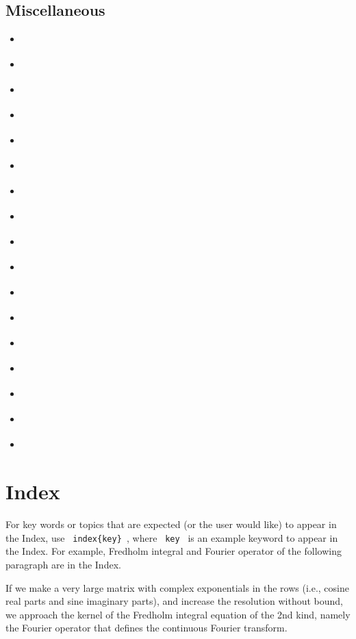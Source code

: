 \begin{multicols}{2}
\subsection*{Miscellaneous}
\begin{itemize}
     \item \cite{almendro}
     \item \cite{baez/online}
     \item \cite{chiu}
     \item \cite{geer}
     \item \cite{hunt-76}
     \item \cite{itzhaki}
     \item \cite{kowalik}
     \item \cite{laufenberg}
     \item \cite{loh}
     \item \cite{markey}
     \item \cite{misc-full}
     \item \cite{padhye}
     \item \cite{sorace}
     \item \cite{wassenberg}
     \item \cite{matuz:doody}
     \item \cite{misc-minimal}
     \item \cite{jcg}
\end{itemize}


\end{multicols}

\cleardoublepage









\newpage
\section*{Index}

For key words or topics that are expected (or the user would like) to appear in the Index, use \verb| index{key} |, where  \verb| key | is an example keyword to appear in the Index. For example, Fredholm integral and Fourier operator of the following paragraph are in the Index. 

If we make a very large matrix with complex exponentials in the rows (i.e., cosine real parts and sine imaginary parts), and increase the resolution without bound, we approach the kernel of the  Fredholm integral equation of the 2nd kind, namely the  Fourier operator that defines the continuous Fourier transform. 

